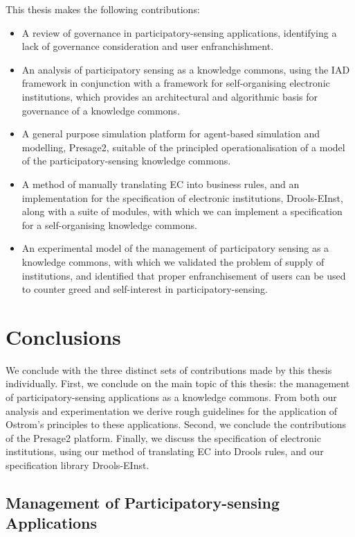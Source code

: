 This thesis makes the following contributions:

\begin{itemize}
\item A review of governance in participatory-sensing applications, identifying a lack of governance consideration and user enfranchishment.
\item An analysis of participatory sensing as a knowledge commons, using the \ac{IAD} framework in conjunction with a framework for self-organising electronic institutions, which provides an architectural and algorithmic basis for governance of a knowledge commons.
\item A general purpose simulation platform for agent-based simulation and modelling, Presage2, suitable of the principled operationalisation of a model of the participatory-sensing knowledge commons.
\item A method of manually translating \acl{EC} into business rules, and an implementation for the specification of electronic institutions, Drools-EInst, along with a suite of modules, with which we can implement a specification for a self-organising knowledge commons.
\item An experimental model of the management of participatory sensing as a knowledge commons, with which we validated the problem of supply of institutions, and identified that proper enfranchisement of users can be used to counter greed and self-interest in participatory-sensing.%
\end{itemize}

\section{Conclusions}

We conclude with the three distinct sets of contributions made by this thesis
individually. First, we conclude on the main topic of this thesis: the management of
participatory-sensing applications as a knowledge commons. From both our analysis
and experimentation we derive rough guidelines for the application of Ostrom's
principles to these applications. Second, we conclude the contributions of the
Presage2 platform. Finally, we discuss the specification of electronic
institutions, using our method of translating \ac{EC} into Drools rules, and
our specification library Drools-EInst.

\subsection{Management of Participatory-sensing Applications}

